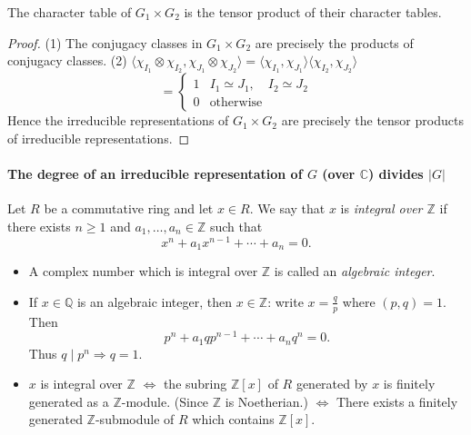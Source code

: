 \documentclass[11pt, a4paper]{report}
\begin{document}
\begin{corollary}
The character table of $G_{1} \times G_{2}$ is the tensor product of their character tables.
\end{corollary}

\begin{proof}
(1) The conjugacy classes in $G_{1} \times G_{2}$ are precisely the products of conjugacy classes.
(2) $\langle \chi_{I_{1}} \otimes \chi_{I_{2}}, \chi_{J_{1}} \otimes \chi_{J_{2}} \rangle = \langle \chi_{I_{1}}, \chi_{J_{1}} \rangle \langle \chi_{I_{2}}, \chi_{J_{2}} \rangle$
\[
= \begin{cases} 1 & I_{1} \simeq J_{1}, \quad I_{2} \simeq J_{2} \\ 0 & \text{otherwise} \end{cases}
\]
Hence the irreducible representations of $G_{1} \times G_{2}$ are precisely the tensor products of irreducible representations.
\end{proof}

\paragraph{The degree of an irreducible representation of $G$ (over $\mathbb{C}$) divides $|G|$}

\begin{definition}
Let $R$ be a commutative ring and let $x \in R$. We say that $x$ is \emph{integral over $\mathbb{Z}$} if there exists $n \geqslant 1$ and $a_{1}, \ldots, a_{n} \in \mathbb{Z}$ such that
\[
x^{n} + a_{1}x^{n-1} + \cdots + a_{n} = 0.
\]
\begin{itemize}
\item A complex number which is integral over $\mathbb{Z}$ is called an \emph{algebraic integer}.
\item If $x \in \mathbb{Q}$ is an algebraic integer, then $x \in \mathbb{Z}$: write $x = \frac{q}{p}$ where $(p, q) = 1$. Then
\[
p^{n} + a_{1}qp^{n-1} + \cdots + a_{n}q^{n} = 0.
\]
Thus $q \mid p^{n} \Longrightarrow q = 1$.
\item $x$ is integral over $\mathbb{Z}$ $\Leftrightarrow$ the subring $\mathbb{Z}[x]$ of $R$ generated by $x$ is finitely generated as a $\mathbb{Z}$-module. (Since $\mathbb{Z}$ is Noetherian.) $\Leftrightarrow$ There exists a finitely generated $\mathbb{Z}$-submodule of $R$ which contains $\mathbb{Z}[x]$.
\end{itemize}
\end{definition}
\end{document}
